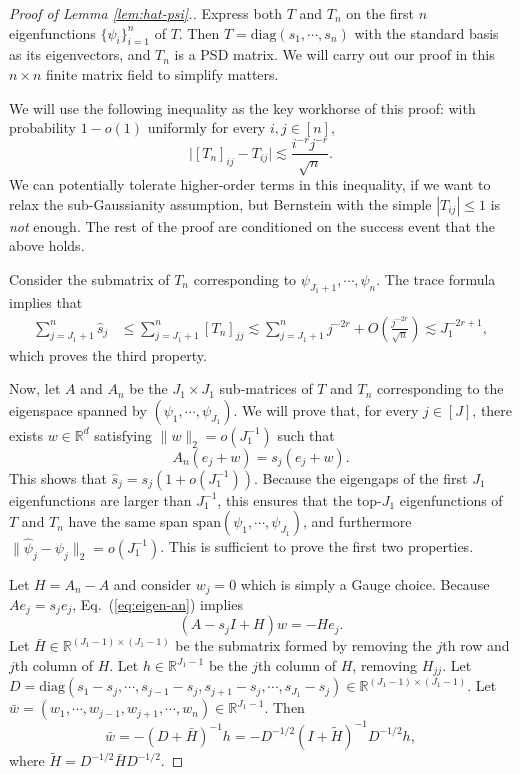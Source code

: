 \documentclass[11pt,a4paper]{article}
\renewcommand{\hat}{\widehat}
\renewcommand{\tilde}{\widetilde}
\theoremstyle{definition}
\theoremstyle{plain}
\theoremstyle{remark}
\newcommand{\diag}{\mathrm{diag}}
\begin{document}
\begin{proof}[Proof of Lemma \ref{lem:hat-psi}.]
Express both $T$ and $T_n$ on the first $n$ eigenfunctions $\{\psi_i\}_{i=1}^n$ of $T$. Then $T=\diag(s_1,\cdots,s_n)$ with the standard basis as its eigenvectors, and $T_n$ is a PSD matrix. 
We will carry out our proof in this $n\times n$ finite matrix field to simplify matters.

We will use the following inequality as the key workhorse of this proof: with probability $1-o(1)$ uniformly for every $i,j\in[n]$, 
$$
\big|[T_n]_{ij} - T_{ij}\big| \lesssim \frac{i^{-r}j^{-r}}{\sqrt{n}}.
$$
We can potentially tolerate higher-order terms in this inequality, if we want to relax the sub-Gaussianity assumption, but Bernstein with the simple $|T_{ij}|\leq 1$ is \emph{not} enough.
The rest of the proof are conditioned on the success event that the above holds.

Consider the submatrix of $T_n$ corresponding to $\psi_{J_1+1},\cdots,\psi_n$. The trace formula implies that
\begin{align*}
\sum_{j=J_1+1}^{n} \hat s_j &\leq \sum_{j=J_1+1}^n [T_n]_{jj} \lesssim \sum_{j=J_1+1}^n j^{-2r} + O\left(\frac{j^{-2r}}{\sqrt{n}}\right) \lesssim J_1^{-2r+1},
\end{align*}
which proves the third property.

Now, let $A$ and $A_n$ be the $J_1\times J_1$ sub-matrices of $T$ and $T_n$ corresponding to the eigenspace spanned by $(\psi_1,\cdots,\psi_{J_1})$.
We will prove that, for every $j\in[J]$, there exists $w\in\mathbb R^d$ satisfying $\|w\|_2 = o(J_1^{-1})$ such that
\begin{equation}
A_n (e_j+w) = s_j(e_j+w).
\label{eq:eigen-an}
\end{equation}
This shows that $\hat s_j=s_j(1+o(J_1^{-1}))$. Because the eigengaps of the first $J_1$ eigenfunctions are larger than $J_1^{-1}$, this ensures that the top-$J_1$ eigenfunctions of $T$ and $T_n$ have the same span $\mathrm{span}(\psi_1,\cdots,\psi_{J_1})$, and furthermore $\|\hat\psi_j-\psi_j\|_2 = o(J_1^{-1})$. This is sufficient to prove the first two properties.

Let $H=A_n-A$ and consider $w_j=0$ which is simply a Gauge choice. Because $Ae_j=s_je_j$, Eq.~(\ref{eq:eigen-an}) implies
$$
(A-s_j I+H)w = -He_j.
$$
Let $\bar H\in\mathbb R^{(J_1-1)\times (J_1-1)}$ be the submatrix formed by removing the $j$th row and $j$th column of $H$. Let $h\in\mathbb R^{J_1-1}$ be the $j$th column of $H$, removing $H_{jj}$.
Let $D=\diag(s_1-s_j,\cdots,s_{j-1}-s_j,s_{j+1}-s_j,\cdots,s_{J_1}-s_j)\in\mathbb R^{(J_1-1)\times(J_1-1)}$. Let $\bar w=(w_1,\cdots,w_{j-1},w_{j+1},\cdots,w_n)\in\mathbb R^{J_1-1}$. Then
$$
\bar w = -(D+\bar H)^{-1}h = -D^{-1/2}(I+\tilde H)^{-1}D^{-1/2}h,
$$
where $\tilde H = D^{-1/2} \bar H D^{-1/2}$. 


\end{proof}
\end{document}
